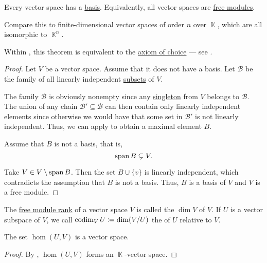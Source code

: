 \begin{theorem}\label{thm:every_vector_space_has_a_basis}
  Every vector space has a \hyperref[def:module_hamel_basis]{basis}. Equivalently, all vector spaces are \hyperref[def:free_semimodule]{free modules}.

  Compare this to finite-dimensional vector spaces of order \( n \) over \( \BbbK \), which are all isomorphic to \( \BbbK^n \).

  Within \hyperref[def:zfc]{}, this theorem is equivalent to the \hyperref[def:zfc/choice]{axiom of choice} --- see .
\end{theorem}
\begin{proof}
  Let \( V \) be a vector space. Assume that it does not have a basis. Let \( \mathcal{B} \) be the family of all linearly independent \hyperref[def:linear_combination]{subsets} of \( V \).

  The family \( \mathcal{B} \) is obviously nonempty since any \hyperref[rem:singleton_sets]{singleton} from \( V \) belongs to \( \mathcal{B} \). The union of any chain \( \mathcal{B}' \subseteq \mathcal{B} \) can then contain only linearly independent elements since otherwise we would have that some set in \( \mathcal{B}' \) is not linearly independent. Thus, we can apply  to obtain a maximal element \( B \).

  Assume that \( B \) is not a basis, that is,
  \begin{equation*}
    \operatorname{span} B \subsetneq V.
  \end{equation*}

  Take \( V \in V \setminus \operatorname{span} B \). Then the set \( B \cup \{ v \} \) is linearly independent, which contradicts the assumption that \( B \) is not a basis. Thus, \( B \) is a basis of \( V \) and \( V \) is a free module.
\end{proof}

\begin{definition}\label{def:vector_space_dimension}
  The \hyperref[def:free_semimodule]{free module rank} of a vector space \( V \) is called the  \( \dim V \) of \( V \). If \( U \) is a vector subspace of \( V \), we call \( \operatorname*{co\negthinspace\dim}_V U \coloneqq \dim(V/U) \) the  of \( U \) relative to \( V \).
\end{definition}

\begin{proposition}\label{thm:linear_maps_form_algebra}
  The set \( \hom(U, V) \) is a vector space.
\end{proposition}
\begin{proof}
  By , \( \hom(U, V) \) forms an \( \BbbK \)-vector space.
\end{proof}

